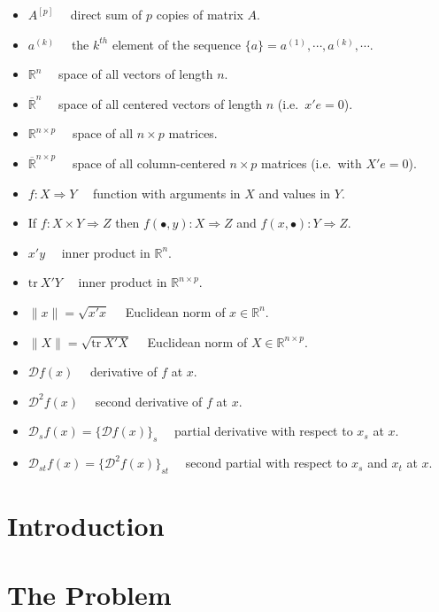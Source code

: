 \documentclass[
  12pt,
]{article}
\begin{document}
\begin{itemize}
\item
  \(A^{[p]}\quad\) direct sum of \(p\) copies of matrix \(A\).
\item
  \(a^{(k)}\quad\) the \(k^{th}\) element of the sequence \(\{a\}=a^{(1)},\cdots,a^{(k)},\cdots\).
\item
  \(\mathbb{R}^n\quad\) space of all vectors of length \(n\).
\item
  \(\overline{\mathbb{R}}^n\quad\) space of all centered vectors of length \(n\) (i.e.~\(x'e=0\)).
\item
  \(\mathbb{R}^{n\times p}\quad\) space of all \(n\times p\) matrices.
\item
  \(\overline{\mathbb{R}}^{n\times p}\quad\) space of all column-centered \(n\times p\) matrices (i.e.~with \(X'e=0\)).
\item
  \(f:X\Rightarrow Y\quad\) function with arguments in \(X\) and values in \(Y\).
\item
  If \(f:X\times Y\Rightarrow Z\) then \(f(\bullet,y):X\Rightarrow Z\)
  and \(f(x,\bullet):Y\Rightarrow Z\).
\item
  \(x'y\quad\) inner product in \(\mathbb{R}^n\).
\item
  \(\text{tr}\ X'Y\quad\) inner product in \(\mathbb{R}^{n\times p}\).
\item
  \(\|x\|=\sqrt{x'x}\quad\) Euclidean norm of \(x\in\mathbb{R}^n\).
\item
  \(\|X\|=\sqrt{\text{tr}\ X'X}\quad\) Euclidean norm of \(X\in\mathbb{R}^{n\times p}\).
\item
  \(\mathcal{D}f(x)\quad\) derivative of \(f\) at \(x\).
\item
  \(\mathcal{D}^2f(x)\quad\) second derivative of \(f\) at \(x\).
\item
  \(\mathcal{D}_sf(x)=\{\mathcal{D}f(x)\}_s\quad\) partial derivative with respect to \(x_s\) at \(x\).
\item
  \(\mathcal{D}_{st}f(x)=\{\mathcal{D}^2f(x)\}_{st}\quad\) second partial with respect to \(x_s\) and \(x_t\) at \(x\).
\end{itemize}

\section{Introduction}\label{introduction}

\section{The Problem}\label{the-problem}
\end{document}

